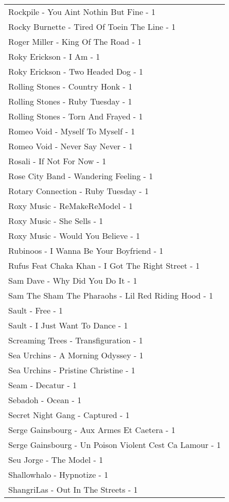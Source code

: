\documentclass[
]{article}
\begin{document}
\begin{longtable}{l}
Rockpile - You Aint Nothin But Fine - 1 \\ 
Rocky Burnette - Tired Of Toein The Line - 1 \\ 
Roger Miller - King Of The Road - 1 \\ 
Roky Erickson - I Am - 1 \\ 
Roky Erickson - Two Headed Dog - 1 \\ 
Rolling Stones - Country Honk - 1 \\ 
Rolling Stones - Ruby Tuesday - 1 \\ 
Rolling Stones - Torn And Frayed - 1 \\ 
Romeo Void - Myself To Myself - 1 \\ 
Romeo Void - Never Say Never - 1 \\ 
Rosali - If Not For Now - 1 \\ 
Rose City Band - Wandering Feeling - 1 \\ 
Rotary Connection - Ruby Tuesday - 1 \\ 
Roxy Music - ReMakeReModel - 1 \\ 
Roxy Music - She Sells - 1 \\ 
Roxy Music - Would You Believe - 1 \\ 
Rubinoos - I Wanna Be Your Boyfriend - 1 \\ 
Rufus Feat Chaka Khan - I Got The Right Street - 1 \\ 
Sam Dave - Why Did You Do It - 1 \\ 
Sam The Sham The Pharaohs - Lil Red Riding Hood - 1 \\ 
Sault - Free - 1 \\ 
Sault - I Just Want To Dance - 1 \\ 
Screaming Trees - Transfiguration - 1 \\ 
Sea Urchins - A Morning Odyssey - 1 \\ 
Sea Urchins - Pristine Christine - 1 \\ 
Seam - Decatur - 1 \\ 
Sebadoh - Ocean - 1 \\ 
Secret Night Gang - Captured - 1 \\ 
Serge Gainsbourg - Aux Armes Et Caetera - 1 \\ 
Serge Gainsbourg - Un Poison Violent Cest Ca Lamour - 1 \\ 
Seu Jorge - The Model - 1 \\ 
Shallowhalo - Hypnotize - 1 \\ 
ShangriLas - Out In The Streets - 1 \\ 

\end{longtable}
\end{document}
